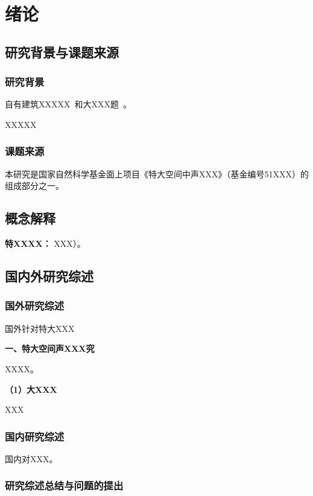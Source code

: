 
\chapter{绪论}
\section{研究背景与课题来源}
\subsection{研究背景}

自有建筑XXXXX~\cite{PLC2006DXTYG,SGR2012TYCG}和大XXX题~\cite{jones2011cocktail,pick1989inhibiting}。

XXXXX


\subsection{课题来源}
本研究是国家自然科学基金面上项目《特大空间中声XXX》（基金编号51XXX）的组成部分之一。
\section{概念解释}

\textbf{特XXXX：}
XXX）。

\section{国内外研究综述}
\subsection{国外研究综述}

国外针对特大XXX

\textbf{一、特大空间声XXX究}

XXXX。

\textbf{（1）大XXX}

XXX



\subsection{国内研究综述}

国内对XXX。

\subsection{研究综述总结与问题的提出}

